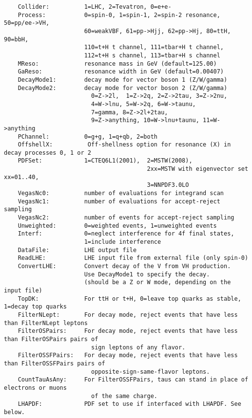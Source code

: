 \documentclass[aps,superscriptaddress,nofootinbib]{revtex4}
\begin{document}
\begin{verbatim}
    Collider:          1=LHC, 2=Tevatron, 0=e+e-
    Process:           0=spin-0, 1=spin-1, 2=spin-2 resonance, 50=pp/ee->VH,
                       60=weakVBF, 61=pp->Hjj, 62=pp->Hj, 80=ttH, 90=bbH,
                       110=t+H t channel, 111=tbar+H t channel,
                       112=t+H s channel, 113=tbar+H s channel
    MReso:             resonance mass in GeV (default=125.00)
    GaReso:            resonance width in GeV (default=0.00407)
    DecayMode1:        decay mode for vector boson 1 (Z/W/gamma)
    DecayMode2:        decay mode for vector boson 2 (Z/W/gamma)
                         0=Z->2l,  1=Z->2q, 2=Z->2tau, 3=Z->2nu,
                         4=W->lnu, 5=W->2q, 6=W->taunu,
                         7=gamma, 8=Z->2l+2tau,
                         9=Z->anything, 10=W->lnu+taunu, 11=W->anything
    PChannel:          0=g+g, 1=q+qb, 2=both
    OffshellX:          Off-shellness option for resonance (X) in decay processes 0, 1 or 2
    PDFSet:            1=CTEQ6L1(2001),  2=MSTW(2008),
                                         2xx=MSTW with eigenvector set xx=01..40,
                                         3=NNPDF3.0LO
    VegasNc0:          number of evaluations for integrand scan
    VegasNc1:          number of evaluations for accept-reject sampling
    VegasNc2:          number of events for accept-reject sampling
    Unweighted:        0=weighted events, 1=unweighted events
    Interf:            0=neglect interference for 4f final states,
                       1=include interference
    DataFile:          LHE output file
    ReadLHE:           LHE input file from external file (only spin-0)
    ConvertLHE:        Convert decay of the V from VH production.
                       Use DecayMode1 to specify the decay.
                       (should be a Z or W mode, depending on the input file)
    TopDK:             For ttH or t+H, 0=leave top quarks as stable, 1=decay top quarks
    FilterNLept:       For decay mode, reject events that have less than FilterNLept leptons
    FilterOSPairs:     For decay mode, reject events that have less than FilterOSPairs pairs of
                         sign leptons of any flavor.
    FilterOSSFPairs:   For decay mode, reject events that have less than FilterOSSFPairs pairs of
                         opposite-sign-same-flavor leptons.
    CountTauAsAny:     For FilterOSSFPairs, taus can stand in place of electrons or muons
                         of the same charge.
    LHAPDF:            PDF set to use if interfaced with LHAPDF. See below.

\end{verbatim}
\end{document}
